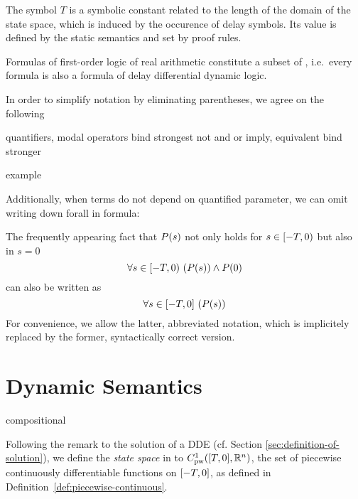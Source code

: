     The symbol $T$ is a symbolic constant related to the length of the domain of the state space, which is induced by the occurence of delay symbols. Its value is defined by the static semantics and set by proof rules.

    Formulas of first-order logic of real arithmetic constitute a subset of \ddL, i.e.\ every \FOLR formula is also a formula of delay differential dynamic logic.

    In order to simplify notation by eliminating parentheses, we agree on the following

    \begin{convention}
        quantifiers, modal operators bind strongest
        not
        and
        or
        imply, equivalent
        bind stronger

        example
    \end{convention}

    Additionally, when terms do not depend on quantified parameter, we can omit writing down forall in formula:

    \begin{convention}
        The frequently appearing fact that $P(s)$ not only holds for $s\in[-T,0)$ but also in $s=0$
        \begin{equation*}
            \forall s\in[-T,0){\,} \left(P(s)\right)\land P(0)
        \end{equation*}
        can also be written as
        \begin{equation*}
            \forall s\in[-T,0]{\,} \left(P(s)\right)
        \end{equation*}
        For convenience, we allow the latter, abbreviated notation, which is implicitely replaced by the former, syntactically correct version.
    \end{convention}

\section{Dynamic Semantics}
    \label{sec:dynamic-semantics}

    compositional

    Following the remark to the solution of a DDE (cf. Section \ref{sec:definition-of-solution}), we define the \emph{state space} in \ddL to $\statespace$, the set of piecewise continuously differentiable functions on $[-T,0]$, as defined in Definition~\ref{def:piecewise-continuous}.


